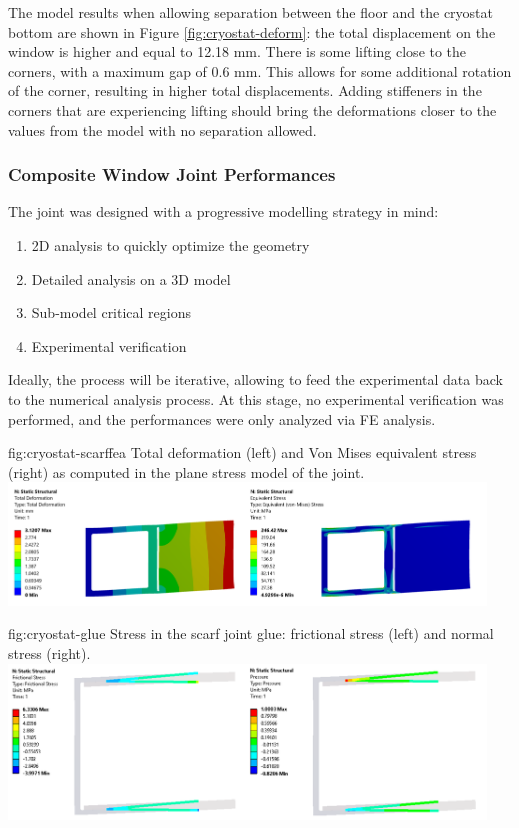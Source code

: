 The model results when allowing separation between the floor and the cryostat bottom are shown in Figure \ref{fig:cryostat-deform}: the total displacement on the window is higher and equal to 12.18 mm. There is some lifting close to the corners, with a maximum gap of 0.6 mm. This allows for some additional rotation of the corner, resulting in higher total displacements. Adding stiffeners in the corners that are experiencing lifting should bring the deformations closer to the values from the model with no separation allowed.

\subsubsection{Composite Window Joint Performances}
\label{sec:cryost-des-warm-joint}

The joint was designed with a progressive modelling strategy in mind:
\begin{enumerate}
\item 2D analysis to quickly optimize the geometry
\item Detailed analysis on a 3D model
\item Sub-model critical regions
\item Experimental verification
\end{enumerate}

Ideally, the process will be iterative, allowing to feed the experimental data back to the numerical analysis process. At this stage, no experimental verification was performed, and the performances were only analyzed via FE analysis.

\begin{dunefigure}{fig:cryostat-scarffea}
{Total deformation (left) and Von Mises equivalent stress (right) as computed in the plane stress model of the joint.}
\includegraphics[width=0.95\textwidth]{graphics/cryostat/cryostat-scarffea.png}
\end{dunefigure}

\begin{dunefigure}{fig:cryostat-glue}
{Stress in the scarf joint glue: frictional stress (left) and normal stress (right).}
\includegraphics[width=0.95\textwidth]{graphics/cryostat/cryostat-glue.png}
\end{dunefigure}

